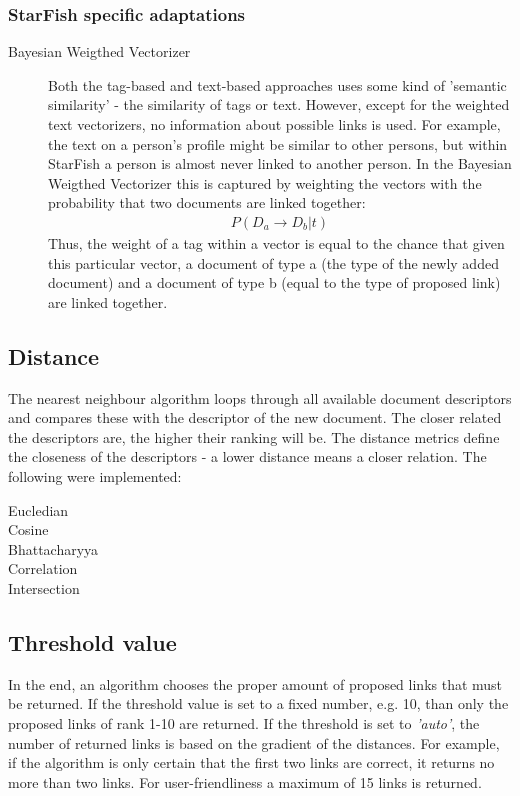 \subsubsection{StarFish specific adaptations}
\begin{description}
\item[Bayesian Weigthed Vectorizer] Both the tag-based and text-based approaches uses some kind of 'semantic similarity' - the similarity of tags or text. However, except for the weighted text vectorizers, no information about possible links is used. For example, the text on a person's profile might be similar to other persons, but within StarFish a person is almost never linked to another person. In the Bayesian Weigthed Vectorizer this is captured by weighting the vectors with the probability that two documents are linked together:
\begin{align}
\nonumber P(D_a \rightarrow D_b | t)
\end{align}
Thus, the weight of a tag within a vector is equal to the chance that given this particular vector, a document of type a (the type of the newly added document) and a document of type b (equal to the type of proposed link) are linked together.
\end{description}

\subsection{Distance}
The nearest neighbour algorithm loops through all available document descriptors and compares these with the descriptor of the new document. The closer related the descriptors are, the higher their ranking will be. The distance metrics define the closeness of the descriptors - a lower distance means a closer relation. The following were implemented:

\begin{description}
\item[Eucledian]
\item[Cosine]
\item[Bhattacharyya]
\item[Correlation]
\item[Intersection]
\end{description}

\subsection{Threshold value}
In the end, an algorithm chooses the proper amount of proposed links that must be returned. If the threshold value is set to a fixed number, e.g. 10, than only the  proposed links of rank 1-10 are returned. If the threshold is set to \emph{'auto'}, the number of returned links is based on the gradient of the distances. For example, if the algorithm is only certain that the first two links are correct, it returns no more than two links. For user-friendliness a maximum of 15 links is returned. 


